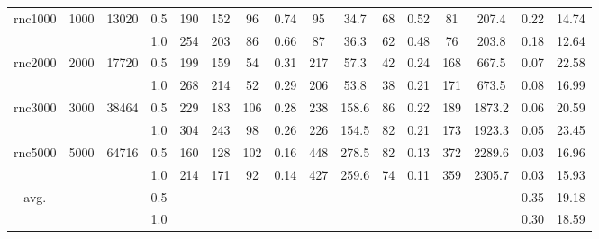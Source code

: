\documentclass[conference]{IEEEtran}
\begin{document}
\begin{table}[!t]
\begin{tabular}{c|c|c|c|c|c|c|c|c|c|c|c|c|c|c|c}
\hline

\multicolumn{1}{c|}{\multirow{2}{*}{\hspace*{-1em}rnc1000\hspace*{-1em}}}   &\multicolumn{1}{c|}{\multirow{2}{*}{1000}}  &\multicolumn{1}{c|}{\multirow{2}{*}{13020}}  &0.5 &190  &152  &96   &0.74  &95  &34.7 &68  &0.52   &81   &207.4    &0.22   & 14.74  \\
& & &1.0 &254  &203  &86   &0.66   &87   &36.3    &62   &0.48  &76  &203.8   &0.18   &12.64  \\

\hline

\multicolumn{1}{c|}{\multirow{2}{*}{\hspace*{-1em}rnc2000\hspace*{-1em}}}  &\multicolumn{1}{c|}{\multirow{2}{*}{2000}}  &\multicolumn{1}{c|}{\multirow{2}{*}{17720}} &0.5  &199  &159  &54   &0.31   &217   &57.3  &42   &0.24  &168   &667.5   &0.07   &22.58 \\
  & & &1.0 &268  &214  &52   &0.29   &206   &53.8   &38   &0.21  &171   &673.5   &0.08   &16.99 \\

\hline

\multicolumn{1}{c|}{\multirow{2}{*}{\hspace*{-1em}rnc3000\hspace*{-1em}}}  &\multicolumn{1}{c|}{\multirow{2}{*}{3000}}  &\multicolumn{1}{c|}{\multirow{2}{*}{38464}} &0.5 &229  &183  &106   &0.28   &238  & 158.6  &86   &0.22  &189   &1873.2   &0.06   &20.59 \\
   &  & &1.0 &304  &243  &98   &0.26   &226   &154.5   &82   &0.21   &173   &1923.3   &0.05   &23.45 \\

\hline

\multicolumn{1}{c|}{\multirow{2}{*}{\hspace*{-1em}rnc5000\hspace*{-1em}}}   &\multicolumn{1}{c|}{\multirow{2}{*}{5000}}   &\multicolumn{1}{c|}{\multirow{2}{*}{64716}} &0.5   &160  &128  &102  &0.16  &448   &278.5    &82   &0.13  &372   &2289.6   &0.03   &16.96 \\
                        &           &             &1.0                                      &214  &171  &92   &0.14   &427  &259.6  &74   &0.11   &359   &2305.7    &0.03   &15.93    \\

\hline
\multicolumn{1}{c|}{\multirow{2}{*}{avg.}}  &  & &0.5 &    &    &  &   &    &  &  &   &  &  &0.35 &19.18 \\
                                           &  &  &1.0 &     &  &   &   &    &  &  &  &  &  &0.30  &18.59 \\

\hline
\hline
\end{tabular}
\label{table:PCTS}
\end{table}
\end{document}
